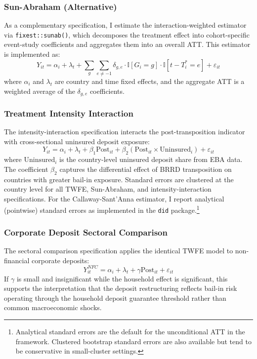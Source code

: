 \documentclass[12pt]{article}
\newcommand{\ind}{\mathbb{I}}
\begin{document}
\subsubsection{Sun-Abraham (Alternative)}

As a complementary specification, I estimate the \citet{sunab2021estimating} interaction-weighted estimator via \texttt{fixest::sunab()}, which decomposes the treatment effect into cohort-specific event-study coefficients and aggregates them into an overall ATT. This estimator is implemented as:
\begin{equation}
Y_{it} = \alpha_i + \lambda_t + \sum_{g} \sum_{e \neq -1} \delta_{g,e} \cdot \ind[G_i = g] \cdot \ind[t - T_i^* = e] + \varepsilon_{it}
\end{equation}
where $\alpha_i$ and $\lambda_t$ are country and time fixed effects, and the aggregate ATT is a weighted average of the $\delta_{g,e}$ coefficients.

\subsubsection{Treatment Intensity Interaction}

The intensity-interaction specification interacts the post-transposition indicator with cross-sectional uninsured deposit exposure:
\begin{equation}
Y_{it} = \alpha_i + \lambda_t + \beta_1 \text{Post}_{it} + \beta_2 (\text{Post}_{it} \times \text{Uninsured}_i) + \varepsilon_{it}
\end{equation}
where $\text{Uninsured}_i$ is the country-level uninsured deposit share from EBA data. The coefficient $\beta_2$ captures the differential effect of BRRD transposition on countries with greater bail-in exposure. Standard errors are clustered at the country level for all TWFE, Sun-Abraham, and intensity-interaction specifications. For the Callaway-Sant'Anna estimator, I report analytical (pointwise) standard errors as implemented in the \texttt{did} package.\footnote{Analytical standard errors are the default for the unconditional ATT in the \citet{callaway2021difference} framework. Clustered bootstrap standard errors are also available but tend to be conservative in small-cluster settings.}

\subsubsection{Corporate Deposit Sectoral Comparison}

The sectoral comparison specification applies the identical TWFE model to non-financial corporate deposits:
\begin{equation}
Y_{it}^{NFC} = \alpha_i + \lambda_t + \gamma \text{Post}_{it} + \varepsilon_{it}
\end{equation}
If $\gamma$ is small and insignificant while the household effect is significant, this supports the interpretation that the deposit restructuring reflects bail-in risk operating through the household deposit guarantee threshold rather than common macroeconomic shocks.
\end{document}
